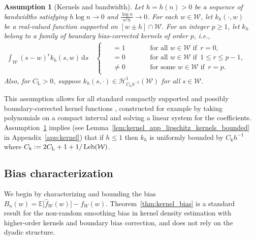 \documentclass[11pt,lof]{puthesis}
\newcommand{\E}{\ensuremath{\mathbb{E}}}
\newcommand{\rL}{\ensuremath{\mathrm{L}}}
\newcommand{\rk}{\ensuremath{\mathrm{k}}}
\newcommand{\cH}{\ensuremath{\mathcal{H}}}
\newcommand{\cW}{\ensuremath{\mathcal{W}}}
\DeclareMathOperator{\Leb}{Leb}
\newcommand{\diff}[1]{\,\mathrm{d}#1}
\theoremstyle{break}
\newtheorem{assumption}{Assumption}[section]
\theoremstyle{proof}
\begin{document}
\begin{assumption}[Kernels and bandwidth]
  \label{ass:kernel_bandwidth}%
  Let $h = h(n) > 0$ be a sequence of bandwidths satisfying $h \log n \to 0$
  and $\frac{\log n}{n^2h} \to 0$. For each $w \in \cW$, let $k_h(\cdot, w)$ be
  a real-valued function supported on $[w \pm h] \cap \cW$. For an integer
  $p \geq 1$, let $k_h$ belong to a family of boundary bias-corrected kernels
  of order $p$, i.e.,
  \begin{align*}
    \int_{\cW}
    (s-w)^r k_h(s,w) \diff{s}
    \quad
    \begin{cases}
      \begin{alignedat}{2}
        &= 1 &\qquad &\text{for all } w \in \cW \text{ if }\, r = 0, \\
        &= 0 & &\text{for all } w \in \cW \text{ if }\, 1 \leq r \leq p-1, \\
        &\neq 0 & &\text{for some } w \in \cW \text{ if }\, r = p.
      \end{alignedat}
    \end{cases}
  \end{align*}
  Also, for $C_\rL > 0$,
  suppose $k_h(s, \cdot) \in \cH^1_{C_\rL h^{-2}}(\cW)$
  for all $s \in \cW$.
\end{assumption}

This assumption allows for all standard compactly supported and possibly
boundary-corrected kernel functions
\citep{wand1994kernel,simonoff1996smoothing}, constructed for example by taking
polynomials on a compact interval and solving a linear system for the
coefficients. Assumption~\ref{ass:kernel_bandwidth} implies
(see Lemma~\ref{lem:kernel_app_lipschitz_kernels_bounded}
in Appendix~\ref{app:kernel})
that if $h \leq 1$ then $k_h$ is uniformly bounded by
$C_\rk h^{-1}$ where $C_\rk \vcentcolon = 2 C_\rL + 1 + 1/\Leb(\cW)$.

\subsection{Bias characterization}
\label{sec:kernel_bias}

We begin by characterizing and bounding the bias
$B_n(w) = \E \big[ \hat f_W(w) \big] - f_W(w)$.
Theorem~\ref{thm:kernel_bias} is a standard result for the non-random smoothing
bias in kernel density estimation with higher-order kernels and boundary bias
correction, and does not rely on the dyadic structure.
\end{document}
